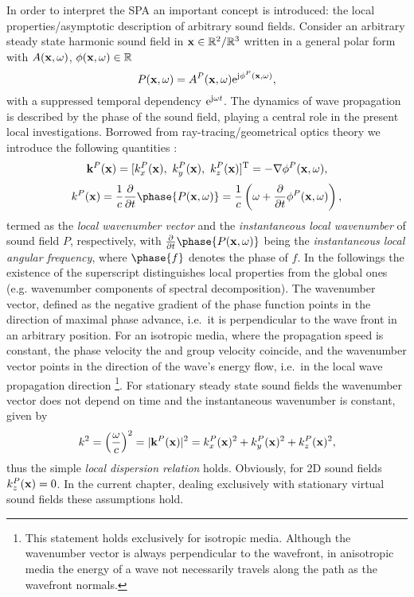 In order to interpret the SPA an important concept is introduced: the local properties/asymptotic description of arbitrary sound fields.
Consider an arbitrary steady state harmonic sound field in $\mathbf{x} \in \mathbb{R}^2 / \mathbb{R}^3$ written in a general polar form with $A(\mathbf{x},\omega)$, $\phi(\mathbf{x},\omega) \in \mathbb{R}$
\begin{equation}
P(\mathbf{x},\omega) = A^P(\mathbf{x},\omega)\mathrm{e}^{\mathrm{j} \phi^P(\mathbf{x},\omega)},
\label{eq:25D_WFS:general_sf}
\end{equation}
%
with a suppressed temporal dependency $\mathrm{e}^{\mathrm{j} \omega t}$.
The dynamics of wave propagation is described by the phase of the sound field, playing a central role in the present local investigations.
Borrowed from ray-tracing/geometrical optics theory we introduce the following quantities \cite{Romer2005,Carozzi2004}:
%
\begin{equation}
\vk^P(\vx) = [k_x^P(\vx),\ k_y^P(\vx),\ k_z^P(\vx)]^{\mathrm{T}} = -\nabla \phi^P(\vx,\omega),
\end{equation}
%
\begin{equation}
k^P(\vx) =  \frac{1}{c} \frac{\partial}{\partial t} \phase{P(\vx,\omega)}  = \frac{1}{c} \left( \omega + \frac{\partial}{\partial t} \phi^P(\vx,\omega) \right),
\end{equation}
%
termed as the \emph{local wavenumber vector} and the \emph{instantaneous local wavenumber} of sound field $P$, respectively, with $ \frac{\partial}{\partial t} \phase{P(\vx,\omega)}$ being the \emph{instantaneous local angular frequency}, where $\phase{f}$ denotes the phase of $f$.
In the followings the existence of the superscript distinguishes local properties from the global ones (e.g. wavenumber components of spectral decomposition).
The wavenumber vector, defined as the negative gradient of the phase function points in the direction of maximal phase advance, i.e.\ it is perpendicular to the wave front in an arbitrary position.
For an isotropic media, where the propagation speed is constant, the phase velocity the and group velocity coincide, and the wavenumber vector points in the direction of the wave's energy flow, i.e.\ in the local wave propagation direction \footnote{This statement holds exclusively for isotropic media.
Although the wavenumber vector is always perpendicular to the wavefront, in anisotropic media the energy of a wave not necessarily travels along the path as the wavefront normals\cite{Pollard1977}.}.
For stationary steady state sound fields the wavenumber vector does not depend on time and the instantaneous wavenumber is constant, given by 
\begin{equation}
k^2 = \left( \frac{\omega}{c} \right)^2 = |\mathbf{k}^P(\mathbf{x})|^2 = k^P_x(\mathbf{x})^2 + k^P_y(\mathbf{x})^2 + k^P_z(\mathbf{x})^2,
\end{equation}
thus the simple \emph{local dispersion relation } holds.
Obviously, for 2D sound fields $k^P_z(\mathbf{x})=0$.
In the current chapter, dealing exclusively with stationary virtual sound fields these assumptions hold.

